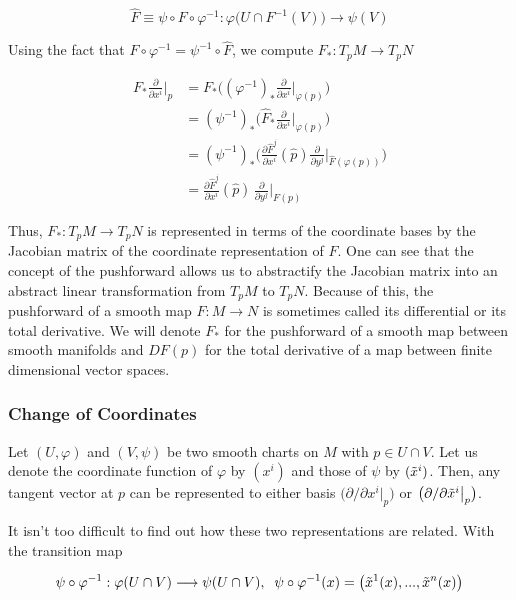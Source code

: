 \documentclass{article}
\theoremstyle{remark}
\theoremstyle{definition}
\begin{document}
      \[\hat{F} \equiv \psi \circ F \circ \varphi^{-1}: \varphi \big( U \cap F^{-1} (V) \big) \longrightarrow \psi (V)\]

    Using the fact that $F \circ \varphi^{-1} = \psi^{-1} \circ \hat{F}$, we compute $F_*: T_p M \longrightarrow T_p N$

    \begin{align*}
      F_* \frac{\partial}{\partial x^i} \bigg|_p & = F_* \bigg( ( \varphi^{-1} )_* \frac{\partial}{\partial x^i} \bigg|_{\varphi(p)} \bigg) \\
      & = (\psi^{-1})_* \bigg( \hat{F}_* \frac{\partial}{\partial x^i} \bigg|_{\varphi(p)}\bigg) \\ 
      & = (\psi^{-1})_* \bigg( \frac{\partial \hat{F}^j}{\partial x^i} (\hat{p}) \frac{\partial}{\partial y^j} \bigg|_{\hat{F}(\varphi(p))} \bigg) \\
      & = \frac{\partial \hat{F}^j}{\partial x^i} (\hat{p})\, \frac{\partial}{\partial y^j} \bigg|_{F(p)} 
    \end{align*}

    Thus, $F_*: T_p M \longrightarrow T_p N$ is represented in terms of the coordinate bases by the Jacobian matrix of the coordinate representation of $F$. One can see that the concept of the pushforward allows us to abstractify the Jacobian matrix into an abstract linear transformation from $T_p M$ to $T_p N$. Because of this, the pushforward of a smooth map $F: M \longrightarrow N$ is sometimes called its differential or its total derivative. We will denote $F_*$ for the pushforward of a smooth map between smooth manifolds and $DF(p)$ for the total derivative of a map between finite dimensional vector spaces. 

    \subsubsection{Change of Coordinates}

      Let $(U, \varphi)$ and $(V, \psi)$ be two smooth charts on $M$ with $p \in U \cap V$. Let us denote the coordinate function of $\varphi$ by $(x^i)$ and those of $\psi$ by $( \Tilde{x}^i)$. Then, any tangent vector at $p$ can be represented to either basis $ \big( \partial/\partial x^i \big|_p \big)$ or $\big( \partial/\partial \Tilde{x}^i \big|_p \big)$. 

      It isn't too difficult to find out how these two representations are related. With the transition map 

        \[\psi \circ \varphi^{-1} : \varphi(U \cap V) \longrightarrow \psi (U \cap V), \;\; \psi \circ \varphi^{-1} (x) = \big( \Tilde{x}^1 (x), ..., \Tilde{x}^n (x) \big)\]
\end{document}

